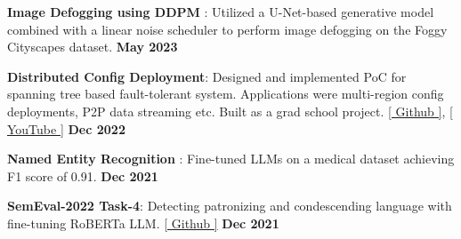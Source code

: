 \begin{zitemize}
\item \textbf{Image Defogging using DDPM} : Utilized a U-Net-based generative model combined with a linear noise scheduler to perform image defogging on the Foggy Cityscapes dataset.  \hfill \textbf{May 2023}
\item \textbf{Distributed Config Deployment}: Designed and implemented PoC for spanning tree based fault-tolerant system. Applications were multi-region config deployments, P2P data streaming etc. Built as a grad school project. \href{https://github.com/tushar-rishav/CSCI5273_Final_Project}{[ Github ]}, \href{https://www.youtube.com/watch?v=tZjVTBsGzvQ}{[ YouTube ]}  \hfill \textbf{Dec 2022}
\item \textbf{Named Entity Recognition} : Fine-tuned LLMs on a medical dataset achieving F1 score of 0.91.  \hfill \textbf{Dec 2021}
\item \textbf{SemEval-2022 Task-4}: Detecting patronizing and condescending language with fine-tuning RoBERTa LLM. \href{https://github.com/tushar-rishav/SemEval-2022}{[ Github ]} \hfill \textbf{Dec 2021}
\vspace{1mm}
\end{zitemize}


